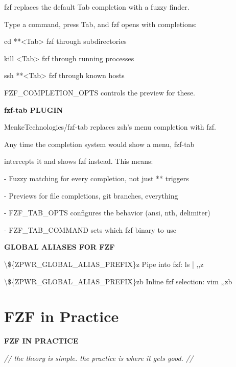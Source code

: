 \documentclass[11pt,a4paper,twoside]{book}
\begin{document}
fzf replaces the default Tab completion with a fuzzy finder.

Type a command, press Tab, and fzf opens with completions:

cd **<Tab>     fzf through subdirectories

kill <Tab>      fzf through running processes

ssh **<Tab>     fzf through known hosts

FZF\_COMPLETION\_OPTS controls the preview for these.


\vspace{12pt}
{\bfseries\color{neonyellow} fzf-tab PLUGIN}\vspace{4pt}

MenkeTechnologies/fzf-tab replaces zsh's menu completion with fzf.

Any time the completion system would show a menu, fzf-tab

intercepts it and shows fzf instead. This means:

- Fuzzy matching for every completion, not just ** triggers

- Previews for file completions, git branches, everything

- FZF\_TAB\_OPTS configures the behavior (ansi, nth, delimiter)

- FZF\_TAB\_COMMAND sets which fzf binary to use


\vspace{12pt}
{\bfseries\color{neonyellow} GLOBAL ALIASES FOR FZF}\vspace{4pt}

\textbackslash{}\$\{ZPWR\_GLOBAL\_ALIAS\_PREFIX\}z   Pipe into fzf: ls | ,,z

\begin{codebox}
\textbackslash{}\$\{ZPWR\_GLOBAL\_ALIAS\_PREFIX\}zb  Inline fzf selection: vim ,,zb\\
\end{codebox}


\vspace{16pt}

\section{FZF in Practice}


\vspace{10pt}
{\large\bfseries\color{neoncyan} FZF IN PRACTICE}\vspace{6pt}

{\small\itshape\color{dimtext} // the theory is simple. the practice is where it gets good. //}
\end{document}
